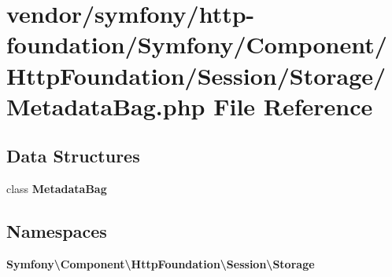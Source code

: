 \section{vendor/symfony/http-\/foundation/\+Symfony/\+Component/\+Http\+Foundation/\+Session/\+Storage/\+Metadata\+Bag.php File Reference}
\label{_metadata_bag_8php}
\subsection*{Data Structures}
\begin{DoxyCompactItemize}
\item 
class {\bf Metadata\+Bag}
\end{DoxyCompactItemize}
\subsection*{Namespaces}
\begin{DoxyCompactItemize}
\item 
 {\bf Symfony\textbackslash{}\+Component\textbackslash{}\+Http\+Foundation\textbackslash{}\+Session\textbackslash{}\+Storage}
\end{DoxyCompactItemize}

